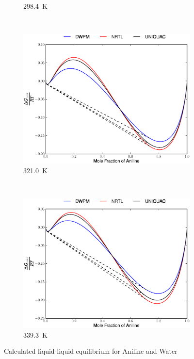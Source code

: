 \begin{figure}[hp]
\begin{subfigure}[h]{0.5\textwidth}
	\caption{298.4~$\mathrm{K}$} 
\end{subfigure}%
\\%
\begin{subfigure}[h]{0.5\textwidth}
	\centering
	\includegraphics[width = \textwidth]{Results_Parts/BinaryParams/aniline-water/AllModelsGibbsPlots/T_321.0.eps}
	\caption{321.0~$\mathrm{K}$} 
\end{subfigure}%
~%
\begin{subfigure}[h]{0.5\textwidth}
	\centering
	\includegraphics[width = \textwidth]{Results_Parts/BinaryParams/aniline-water/AllModelsGibbsPlots/T_339.3.eps}
	\caption{339.3~$\mathrm{K}$} 
\end{subfigure}%
\caption{Calculated liquid-liquid equilibrium for Aniline and Water}
\end{figure}
